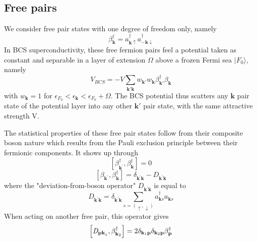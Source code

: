 \documentclass[aps,prb,preprint,groupedaddress,amsmath]{revtex4}
\newcommand{\vp}{\ensuremath{\mathbf{p}}}
\newcommand{\vk}{\ensuremath{\mathbf{k}}}
\newcommand{\dg}{\ensuremath{\dagger}}
\begin{document}
\subsection{Free pairs}
We consider free pair states with one degree of freedom only, namely
\begin{equation}\label{eq:beta}
\beta_\vk^\dg=a^\dg_{\vk\uparrow}{}a^\dg_{-\vk\downarrow}
\end{equation}
 In BCS superconductivity, these free fermion pairs feel a potential taken as constant and separable in a layer of extension $\Omega$ above a frozen Fermi sea $|F_0{\rangle}$, namely
\begin{equation}
V_{BCS}=-V\sum_{\vk'\vk}w_{\vk'}w_{\vk}\beta^\dg_{\vk'}\beta^{}_\vk
\label{eq:}
\end{equation}
with $w_\vk=1$ for $\epsilon_{F_0}<\epsilon_\vk<\epsilon_{F_0}+\Omega$. The BCS potential thus scatters any $\vk$ pair state of the potential layer into any other $\vk'$ pair state, with the same attractive strength V.

The statistical properties of these free pair states follow from their composite boson nature which results from the Pauli exclusion principle between their fermionic components. It shows up through
\begin{equation}  
\left[\beta^{\dagger}_{\mathbf{k} ^{\prime}},\beta^{\dagger}_{\mathbf{k} }%
\right]  =0
\end{equation}
\begin{equation}  \label{eq:betacom}
\left[\beta_{\mathbf{k} ^{\prime}},\beta^{\dagger}_{\mathbf{k} }\right] 
=\delta_{\mathbf{k} ^{\prime}\mathbf{k} }-\mathit{D} _{\mathbf{k} ^{\prime}%
\mathbf{k} }
\end{equation}
where the "deviation-from-boson operator" $\mathit{D} _{\mathbf{k} ^{\prime}\mathbf{k} }$ is equal to
\begin{equation}\label{eq:D}
\mathit{D} _{\mathbf{k} ^{\prime}\mathbf{k} }=\delta_{\mathbf{k} ^{\prime}\mathbf{k}}\sum_{s=(\uparrow,\downarrow)}a^\dg_{\vk{s}}{}a^{}_{\vk{s}}
\end{equation}
 When acting on another free pair, this operator gives
\begin{equation}
\left[\mathit{D} _{\mathbf{p}\mathbf{k} ^{}_1},\beta^{\dagger}_{%
\mathbf{k} _2}\right]  =2\delta_{\mathbf{k}_1 \mathbf{p} }\delta_{\mathbf{k}_2 \mathbf{p} }\beta_\vp^\dg
\end{equation}
\end{document}
